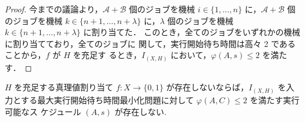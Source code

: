 \documentclass[12pt]{optlab-bachelor}
\begin{document}
\begin{proof}
  今までの議論より，$\mathcal{A} + \mathcal{B}$ 個のジョブを機械 $i \in
  \{1,\ldots,n\}$ に，$\mathcal{A} + \mathcal{B}$ 個のジョブを機械 $k \in\{n + 1, \ldots, n + \lambda\}$ に，$\lambda$ 個のジョブを機械 $k \in\{n + 1, \ldots, n + \lambda\}$ に割り当てた．
  このとき，全てのジョブをいずれかの機械に割り当てており，全てのジョブに
  関して，実行開始待ち時間は高々 2 であることから，$f$ が $H$ を充足す
  るとき，$I_{(X,H)}$ において，$\varphi(A,s) \le 2$ を満たす．
\end{proof}

\begin{lemma}\label{l_7}
  $H$ を充足する真理値割り当て $f : X \to \{0,1\}$ が存在しないならば，$I_{(X,H)}$ を入力とする最大実行開始待ち時間最小化問題に対して
  $\varphi(A, C) \le 2$ を満たす実行可能なス
  ケジュール $(A,s)$ が存在しない.
\end{lemma}
\end{document}
